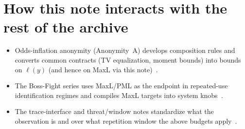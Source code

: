 \documentclass[11pt]{article}
\begin{document}
\section*{How this note interacts with the rest of the archive}
\begin{itemize}[leftmargin=*]
\item Odds-inflation anonymity (Anonymity~A) develops composition rules and converts common contracts (TV equalization, moment bounds) into bounds on $\ell(y)$ (and hence on MaxL via this note)~\cite{series:oddsinflation}.
\item The Boss-Fight series uses MaxL/PML as the endpoint in repeated-use identification regimes and compiles MaxL targets into system knobs~\cite{series:bossfightA,series:bossfightB}.
\item The trace-interface and threat/window notes standardize what the observation is and over what repetition window the above budgets apply~\cite{series:traceifaces,series:threatwindows}.
\end{itemize}
\end{document}
